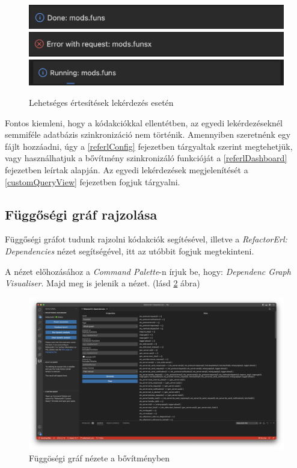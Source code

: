 \begin{figure}[H]
  \centering
  \includegraphics[width=0.45\linewidth]{images/notification_done.png}
  \includegraphics[width=0.45\linewidth]{images/notification_error.png}
  \includegraphics[width=0.45\linewidth]{images/notification_running.png}

  \caption{Lehetséges  értesítések lekérdezés esetén}
  \label{fig:notifications}
\end{figure}

Fontos kiemleni, hogy a kódakciókkal ellentétben, az egyedi lekérdezéseknél semmiféle adatbázis szinkronizáció nem történik. Amennyiben szeretnénk egy fájlt hozzáadni, úgy a \ref{referlConfig}
fejezetben tárgyaltak szerint megtehetjük, vagy használhatjuk a bővítmény szinkronizáló funkcióját a \ref{referlDashboard} fejezetben leírtak alapján. Az egyedi lekérdezések megjelenítését a \ref{customQueryView} fejezetben fogjuk tárgyalni.



\subsection{Függőségi gráf rajzolása} \label{sectionDepGraph}

Függőségi gráfot tudunk rajzolni kódakciók segítésével, illetve a \textit{RefactorErl: Dependencies} nézet segítségével, itt az utóbbit fogjuk megtekinteni.

A nézet előhozásához a \textit{Command Palette}-n írjuk be, hogy: \textit{Dependenc Graph Visualiser}. Majd meg is jelenik a nézet. (lásd \ref{fig:depGraphView} ábra)

\begin{figure}[H]
  \centering
  \includegraphics[width=\linewidth, clip=true, trim = 0mm 0mm 200mm 0mm]{images/dependency.png}
  \caption{Függöségi gráf nézete a bővítményben}
  \label{fig:depGraphView}
\end{figure}

